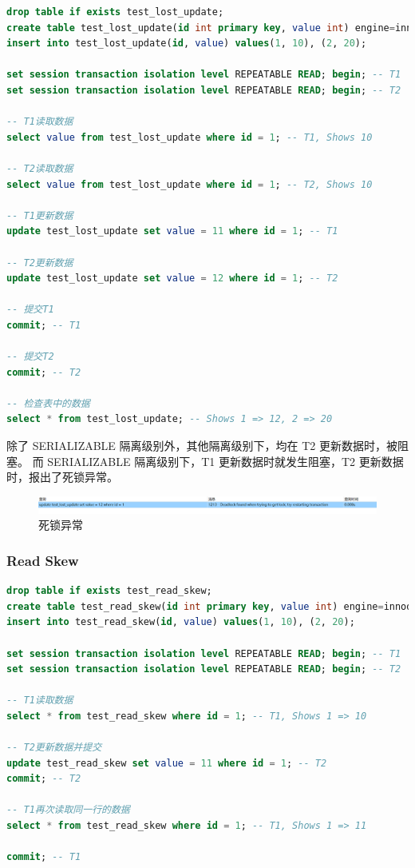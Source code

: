\documentclass{article}
\begin{document}
\begin{lstlisting}[language=sql]
drop table if exists test_lost_update;
create table test_lost_update(id int primary key, value int) engine=innodb;
insert into test_lost_update(id, value) values(1, 10), (2, 20);

set session transaction isolation level REPEATABLE READ; begin; -- T1
set session transaction isolation level REPEATABLE READ; begin; -- T2

-- T1读取数据
select value from test_lost_update where id = 1; -- T1, Shows 10

-- T2读取数据
select value from test_lost_update where id = 1; -- T2, Shows 10

-- T1更新数据
update test_lost_update set value = 11 where id = 1; -- T1

-- T2更新数据
update test_lost_update set value = 12 where id = 1; -- T2

-- 提交T1
commit; -- T1

-- 提交T2
commit; -- T2

-- 检查表中的数据
select * from test_lost_update; -- Shows 1 => 12, 2 => 20
\end{lstlisting}

除了 SERIALIZABLE 隔离级别外，其他隔离级别下，均在 T2 更新数据时，被阻塞。
而 SERIALIZABLE 隔离级别下，T1 更新数据时就发生阻塞，T2 更新数据时，报出了死锁异常。

\begin{figure}[H]
\centering
\includegraphics[width=\textwidth]{img/59.png}
\caption{死锁异常}
\end{figure}

\subsubsection{Read Skew}

\begin{lstlisting}[language=sql]
drop table if exists test_read_skew;
create table test_read_skew(id int primary key, value int) engine=innodb;
insert into test_read_skew(id, value) values(1, 10), (2, 20);

set session transaction isolation level REPEATABLE READ; begin; -- T1
set session transaction isolation level REPEATABLE READ; begin; -- T2

-- T1读取数据
select * from test_read_skew where id = 1; -- T1, Shows 1 => 10

-- T2更新数据并提交
update test_read_skew set value = 11 where id = 1; -- T2
commit; -- T2

-- T1再次读取同一行的数据
select * from test_read_skew where id = 1; -- T1, Shows 1 => 11

commit; -- T1
\end{lstlisting}
\end{document}
